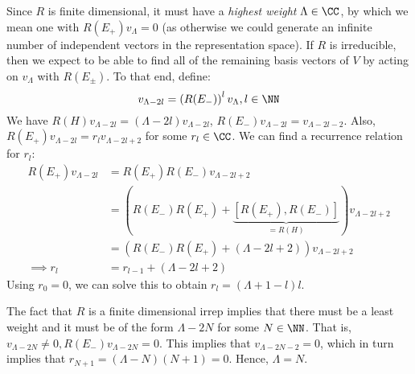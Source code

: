 \documentclass{jknotes}
\begin{document}
Since \(R\) is finite dimensional, it must have a \emph{highest weight} \(\Lambda \in \CC\), by which we mean one with \(R(E_+)v_\Lambda = 0\) (as otherwise we could generate an infinite number of independent vectors in the representation space). If \(R\) is irreducible, then we expect to be able to find all of the remaining basis vectors of \(V\) by acting on \(v_\Lambda\) with \(R(E_\pm)\). To that end, define:
\begin{equation}
    v_{\Lambda-2l} = \left( R(E_-) \right)^l v_\Lambda, l \in \NN
\end{equation}
We have \(R(H)v_{\Lambda-2l} = (\Lambda-2l)v_{\Lambda-2l}\), \(R(E_-)v_{\Lambda-2l} = v_{\Lambda-2l-2}\). Also, \(R(E_+)v_{\Lambda-2l} = r_lv_{\Lambda-2l+2}\) for some \(r_l \in \CC\). We can find a recurrence relation for \(r_l\):
\begin{align}
    R(E_+)v_{\Lambda-2l} &= R(E_+)R(E_-)v_{\Lambda-2l+2} \\
    &= ( R(E_-)R(E_+) + \underbrace{[R(E_+),R(E_-)]}_{=R(H)}) v_{\Lambda-2l+2} \\
    &= \left( R(E_-)R(E_+) + (\Lambda-2l+2) \right) v_{\Lambda-2l+2} \\
    \implies r_l &= r_{l-1} + (\Lambda-2l+2)
\end{align}
Using \(r_0 = 0\), we can solve this to obtain \(r_l = (\Lambda+1-l)l\).

The fact that \(R\) is a finite dimensional irrep implies that there must be a least weight and it must be of the form \(\Lambda-2N\) for some \(N\in\NN\). That is, \(v_{\Lambda-2N} \ne 0, R(E_-)v_{\Lambda-2N} = 0\). This implies that \(v_{\Lambda-2N-2} = 0\), which in turn implies that \(r_{N+1} = (\Lambda-N)(N+1) = 0\). Hence, \(\Lambda = N\).
\end{document}
